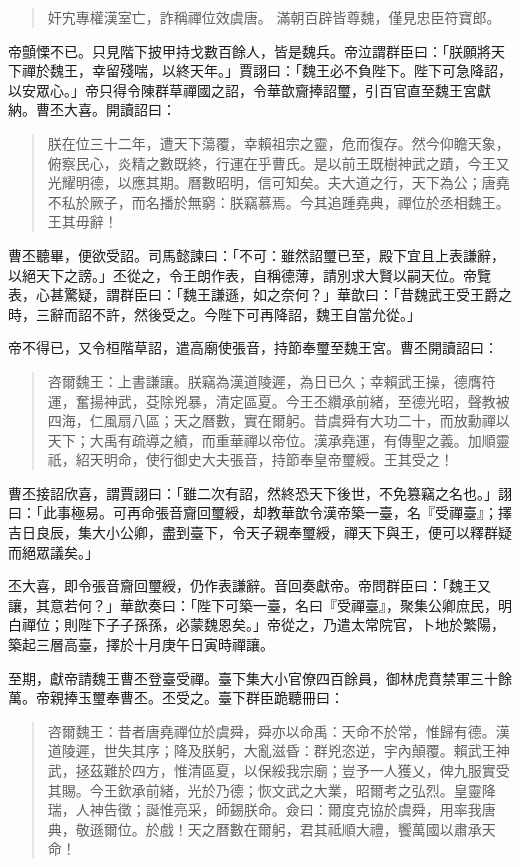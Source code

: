 \begin{quote}
奸宄專權漢室亡，詐稱禪位效虞唐。
滿朝百辟皆尊魏，僅見忠臣符寶郎。
\end{quote}

帝顫慄不已。只見階下披甲持戈數百餘人，皆是魏兵。帝泣謂群臣曰：「朕願將天下禪於魏王，幸留殘喘，以終天年。」賈詡曰：「魏王必不負陛下。陛下可急降詔，以安眾心。」帝只得令陳群草禪國之詔，令華歆齎捧詔璽，引百官直至魏王宮獻納。曹丕大喜。開讀詔曰：

\begin{quote}
朕在位三十二年，遭天下蕩覆，幸賴祖宗之靈，危而復存。然今仰瞻天象，俯察民心，炎精之數既終，行運在乎曹氏。是以前王既樹神武之蹟，今王又光耀明德，以應其期。曆數昭明，信可知矣。夫大道之行，天下為公；唐堯不私於厥子，而名播於無窮：朕竊慕焉。今其追踵堯典，禪位於丞相魏王。王其毋辭！
\end{quote}

曹丕聽畢，便欲受詔。司馬懿諫曰：「不可：雖然詔璽已至，殿下宜且上表謙辭，以絕天下之謗。」丕從之，令王朗作表，自稱德薄，請別求大賢以嗣天位。帝覽表，心甚驚疑，謂群臣曰：「魏王謙遜，如之奈何？」華歆曰：「昔魏武王受王爵之時，三辭而詔不許，然後受之。今陛下可再降詔，魏王自當允從。」

帝不得已，又令桓階草詔，遣高廟使張音，持節奉璽至魏王宮。曹丕開讀詔曰：

\begin{quote}
咨爾魏王：上書謙讓。朕竊為漢道陵遲，為日已久；幸賴武王操，德膺符運，奮揚神武，芟除兇暴，清定區夏。今王丕纘承前緒，至德光昭，聲教被四海，仁風扇八區；天之曆數，實在爾躬。昔虞舜有大功二十，而放勳禪以天下；大禹有疏導之績，而重華禪以帝位。漢承堯運，有傳聖之義。加順靈祇，紹天明命，使行御史大夫張音，持節奉皇帝璽綬。王其受之！
\end{quote}

曹丕接詔欣喜，謂賈詡曰：「雖二次有詔，然終恐天下後世，不免篡竊之名也。」詡曰：「此事極易。可再命張音齎回璽綬，却教華歆令漢帝築一臺，名『受禪臺』；擇吉日良辰，集大小公卿，盡到臺下，令天子親奉璽綬，禪天下與王，便可以釋群疑而絕眾議矣。」

丕大喜，即令張音齎回璽綬，仍作表謙辭。音回奏獻帝。帝問群臣曰：「魏王又讓，其意若何？」華歆奏曰：「陛下可築一臺，名曰『受禪臺』，聚集公卿庶民，明白禪位；則陛下子子孫孫，必蒙魏恩矣。」帝從之，乃遣太常院官，卜地於繁陽，築起三層高臺，擇於十月庚午日寅時禪讓。

至期，獻帝請魏王曹丕登臺受禪。臺下集大小官僚四百餘員，御林虎賁禁軍三十餘萬。帝親捧玉璽奉曹丕。丕受之。臺下群臣跪聽冊曰：

\begin{quote}
咨爾魏王：昔者唐堯禪位於虞舜，舜亦以命禹：天命不於常，惟歸有德。漢道陵遲，世失其序；降及朕躬，大亂滋昏：群兇恣逆，宇內顛覆。賴武王神武，拯茲難於四方，惟清區夏，以保綏我宗廟；豈予一人獲乂，俾九服實受其賜。今王欽承前緒，光於乃德；恢文武之大業，昭爾考之弘烈。皇靈降瑞，人神告徵；誕惟亮采，師錫朕命。僉曰：爾度克協於虞舜，用率我唐典，敬遜爾位。於戲！天之曆數在爾躬，君其祗順大禮，饗萬國以肅承天命！
\end{quote}

